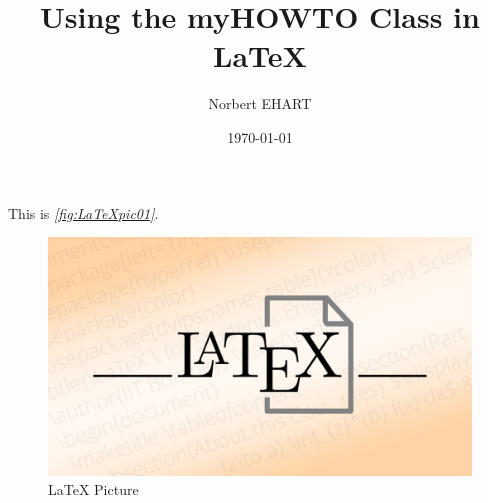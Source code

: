 \documentclass[]{myHOWTO-V1}
\title{Using the myHOWTO Class in \LaTeX}
\author{Norbert EHART}
\date{\today}
\begin{document}
\listoffigures

This is \emph{\autoref{fig:LaTeXpic01}}.

\begin{figure}[h]
	\centering
	\begin{tcb_figure}
		\centering
		\includegraphics[scale=0.2]{zz_bsp_file_LOF_LaTeX.jpg}
	\end{tcb_figure}
	\vspace{-4mm}
	\caption[LaTeX{} Picture]{\LaTeX{} Picture\cite{edx2022}}
	\label{fig:LaTeXpic01}
\end{figure}
\end{document}
